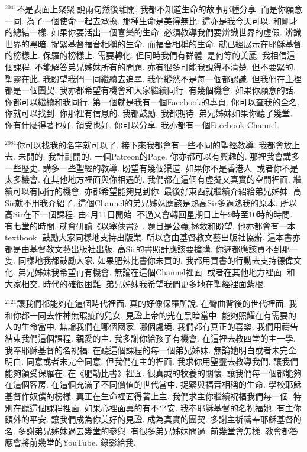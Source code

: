 \documentclass{book}
\begin{document}
$^{2041}$不是表面上聚聚,說兩句然後離開.
我都不知道生命的故事那種分享.
而是你願意一同.
為了一個使命一起去承擔.
那種生命是美得無比.
這亦是我今天可以.
和剛才的總結一樣.
如果你要活出一個喜樂的生命.
必須教導我們要辨識世界的虛假.
辨識世界的黑暗.
捉緊基督福音相稱的生命.
而福音相稱的生命.
就已經展示在耶穌基督的榜樣上.
保羅的榜樣上.
需要轉化.
但同時我們有群體.
是何等的美麗.
我相信這個課程.
不能解答弟兄姊妹所有的問題.
亦有很多可能我說得不清楚.
但不要緊的.
聖靈在此.
我盼望我們一同繼續去追尋.
我們縱然不是每一個都認識.
但我們在主裡都是一個團契.
我亦都希望有機會和大家繼續同行.
有幾個機會.
如果你願意的話.
你都可以繼續和我同行.
第一個就是我有一個Facebook的專頁.
你可以查我的全名.
你就可以找到.
你那裡有信息的.
我都鼓勵.
我都期待.
弟兄姊妹如果你聽了幾堂.
你有什麼得著也好.
領受也好.
你可以分享.
我亦都有一個Facebook Channel.

$^{2081}$你可以找我的名字就可以了.
接下來我都會有一些不同的聖經教導.
我都會放上去.
未開的.
我計劃開的.
一個Patreon的Page.
你亦都可以有興趣的.
那裡我會講多一些歷史.
講多一些聖經的教導.
盼望有幾個渠道.
如果你不是香港人.
或者你不是太多機會.
在其他地方裡面與你相遇的.
我們都在這個有虛擬又真實的空間裡面.
繼續可以有同行的機會.
亦都希望能夠見到你.
最後好東西就繼續介紹給弟兄姊妹.
高Sir就不用我介紹了.
這個Channel的弟兄姊妹應該是熟高Sir多過熟我的原本.
所以高Sir在下一個課程.
由4月11日開始.
不過又會轉回星期日上午9時至10時的時間.
有七堂的時間.
就會研讀《以塞俠書》.
題目是公義,拯救和盼望.
他亦都會有一本textbook.
鼓勵大家同樣地支持出版業.
所以會由基督教文藝出版社協辦.
這本書亦都是由基督教文藝出版社出版.
高Sir的書照計應該要搶購.
你遲都應該買不到那一隻.
同樣地我都鼓勵大家.
如果肥辣比書你未買的.
我都用買書的行動去支持德偉文化.
弟兄姊妹我希望再有機會.
無論在這個Channel裡面.
或者在其他地方裡面.
和大家相交.
時代的確很困難.
弟兄姊妹我希望我們更多地在聖經裡面紮根.

$^{2121}$讓我們都能夠在這個時代裡面.
真的好像保羅所說.
在彎曲背後的世代裡面.
我和你都一同去作神無瑕疵的兒女.
見證上帝的光在黑暗當中.
能夠照耀在有需要的人的生命當中.
無論我們在哪個國家.
哪個處境.
我們都有真正的喜樂.
我們用禱告結束我們這個課程.
親愛的主.
我多謝你給孩子有機會.
在這裡去教四堂的主一學.
我奉耶穌基督的名祝福.
在聽這個課程的每一個弟兄姊妹.
無論她明白或者未完全明白.
同意或者未完全同意.
但我們在主的裡面.
我求你用聖靈去教導我們.
讓我們能夠領受保羅在.
在《肥勒比書》裡面.
很真誠的牧養的關懷.
讓我們每一個都能夠在這個客房.
在這個充滿了不同價值的世代當中.
捉緊與福音相稱的生命.
學校耶穌基督作奴僕的榜樣.
真正在生命裡面得著上主.
我們求主你繼續祝福我們每一個.
特別在聽這個課程裡面.
如果心裡面真的有不平安.
我奉耶穌基督的名祝福她.
有主你額外的平安.
讓我們成為你美好的見證.
成為真實的團契.
多謝主祈禱奉耶穌基督的名.
多謝弟兄姊妹過去幾堂的參與.
有很多弟兄姊妹問過.
前幾堂會怎樣.
教會都答應會將前幾堂的YouTube.
錄影給我.
\end{document}
